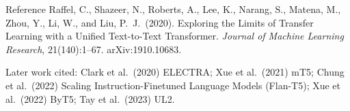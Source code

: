 \documentclass[aspectratio=169,11pt]{beamer}
\begin{document}
\begin{frame}{Reference}
  \small
  Raffel, C., Shazeer, N., Roberts, A., Lee, K., Narang, S., Matena, M., Zhou, Y., Li, W., and Liu, P.\ J.\ (2020). Exploring the Limits of Transfer Learning with a Unified Text-to-Text Transformer. \emph{Journal of Machine Learning Research}, 21(140):1--67. arXiv:1910.10683.
  \vspace{3mm}

  {\footnotesize Later work cited: Clark et al.\ (2020) ELECTRA; Xue et al.\ (2021) mT5; Chung et al.\ (2022) Scaling Instruction-Finetuned Language Models (Flan-T5); Xue et al.\ (2022) ByT5; Tay et al.\ (2023) UL2.}
\end{frame}
\end{document}

